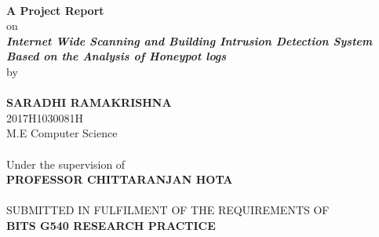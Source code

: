 \documentclass{report}
\begin{document}
\paragraph{}
\begin{center}
\textbf{A Project Report } \\[20pt]
on \\[20pt]


\textbf{\large{\textsl{Internet Wide Scanning and Building Intrusion Detection System Based on the Analysis of Honeypot logs }}} \\[20pt]

by 
\end{center}

\paragraph{}
\begin{center}
\textbf{SARADHI RAMAKRISHNA} \\
2017H1030081H \\
M.E Computer Science
\end{center}

\paragraph{}
\begin{center}
Under the supervision of \\
\textbf{PROFESSOR CHITTARANJAN HOTA} \\
\end{center}

\paragraph{}
\begin{center}
SUBMITTED IN FULFILMENT OF THE REQUIREMENTS OF \\
\textbf{BITS G540 RESEARCH PRACTICE}
\end{center}
\end{document}
